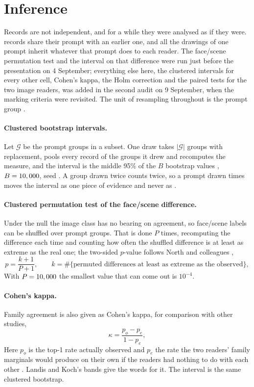 \section{Inference}
\label{sec:method-inference}

Records are not independent, and for a while they were analysed as if they were. \nRepeats{} records share their prompt with an earlier one, and all the drawings of one prompt inherit whatever that prompt does to each reader. The face/scene permutation test and the interval on that difference were run just before the presentation on 4 September; everything else here, the clustered intervals for every other cell, Cohen's kappa, the Holm correction and the paired tests for the two image readers, was added in the second audit on 9 September, when the marking criteria were revisited. The unit of resampling throughout is the prompt group \cite{cameron2008bootstrap}.

\paragraph{Clustered bootstrap intervals.} Let $\mathcal{G}$ be the prompt groups in a subset. One draw takes $|\mathcal{G}|$ groups with replacement, pools every record of the groups it drew and recomputes the measure, and the interval is the middle 95\% of the $B$ bootstrap values \cite{efron1993introduction}, $B = 10,000{}$, seed \nullSeed{}. A group drawn twice counts twice, so a prompt drawn \nHappy{} times moves the interval as one piece of evidence and never as \nHappy{}.

\paragraph{Clustered permutation test of the face/scene difference.} Under the null the image class has no bearing on agreement, so face/scene labels can be shuffled over prompt groups. That is done $P$ times, recomputing the difference each time and counting how often the shuffled difference is at least as extreme as the real one; the two-sided $p$-value follows North and colleagues \cite{north2002note},
\begin{equation}
p = \frac{k + 1}{P + 1}, \qquad k = \#\{\text{permuted differences at least as extreme as the observed}\},
\label{eq:permp}
\end{equation}
With $P = 10,000$ the smallest value that can come out is $10^{-4}$.

\paragraph{Cohen's kappa.} Family agreement is also given as Cohen's kappa, for comparison with other studies,
\begin{equation}
\kappa = \frac{p_o - p_e}{1 - p_e},
\label{eq:kappa}
\end{equation}
Here $p_o$ is the top-1 rate actually observed and $p_e$ the rate the two readers' family marginals would produce on their own if the readers had nothing to do with each other \cite{cohen1960coefficient}. Landis and Koch's bands \cite{landis1977measurement} give the words for it. The interval is the same clustered bootstrap.

